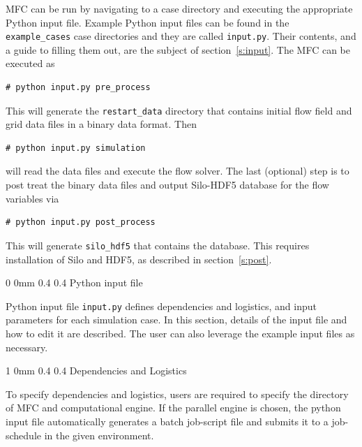 \documentclass[11pt]{article}
\makeatletter
\renewcommand{\section}{\@startsection
{section}%
{0}%
{0mm}%
{0.4\baselineskip}%
{0.4\baselineskip}%
{\normalfont\Large\bfseries\color{myBrown}}}%
\renewcommand{\subsection}{\@startsection
{subsection}%
{1}%
{0mm}%
{0.4\baselineskip}%
{0.4\baselineskip}%
{\normalfont\large\bfseries\color{myBrown}}}%
\makeatother
\begin{document}
MFC can be run by navigating to a case directory and executing the appropriate Python input file.
Example Python input files can be found in the \texttt{example\_cases} case directories and they are called \texttt{input.py}.
Their contents, and a guide to filling them out, are the subject of section~\ref{s:input}.
The MFC can be executed as
\begin{lstlisting}[style=BashInputStyle]
	# python input.py pre_process
\end{lstlisting}
This will generate the \texttt{restart_data} directory that contains initial flow field and grid data files in a binary data format.
Then
\begin{lstlisting}[style=BashInputStyle]
	# python input.py simulation
\end{lstlisting}
will read the data files and execute the flow solver. 
The last (optional) step is to post treat the binary data files and output Silo-HDF5 database for the flow variables via
\begin{lstlisting}[style=BashInputStyle]
	# python input.py post_process
\end{lstlisting}
This will generate \texttt{silo_hdf5} that contains the database.
This requires installation of Silo and HDF5, as described in section~\ref{s:post}.

\section{Python input file}\label{s:input}

Python input file \texttt{input.py} defines dependencies and logistics, and input parameters for each simulation case.
In this section, details of the input file and how to edit it are described.
The user can also leverage the example input files as necessary.

\subsection{Dependencies and Logistics}

To specify dependencies and logistics, users are required to specify the directory of MFC and computational engine.
If the parallel engine is chosen, the python input file automatically generates a batch job-script file and submits it to a job-schedule in the given environment.
\end{document}
